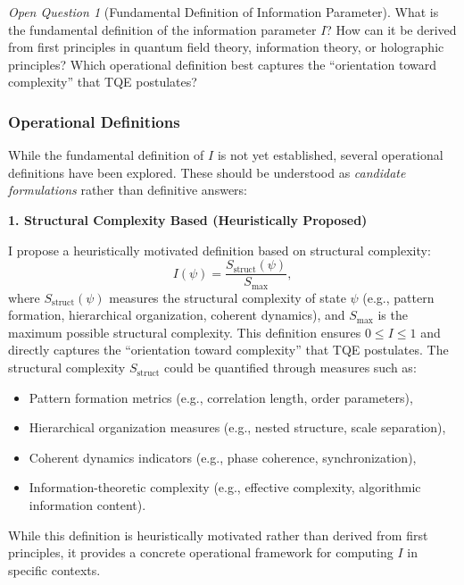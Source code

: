 \documentclass[12pt,a4paper]{article}
\theoremstyle{definition}
\theoremstyle{remark}
\newtheorem{question}{Open Question}[section]
\begin{document}
\begin{question}[Fundamental Definition of Information Parameter]
What is the fundamental definition of the information parameter $I$? How can it be derived from first principles in quantum field theory, information theory, or holographic principles? Which operational definition best captures the ``orientation toward complexity'' that TQE postulates?
\end{question}

\subsubsection{Operational Definitions}

While the fundamental definition of $I$ is not yet established, several operational definitions have been explored. These should be understood as \emph{candidate formulations} rather than definitive answers:

\textbf{1. Structural Complexity Based (Heuristically Proposed)}

I propose a heuristically motivated definition based on structural complexity:
\begin{equation}\label{eq:I_struct}
I(\psi) = \frac{S_{\text{struct}}(\psi)}{S_{\text{max}}},
\end{equation}
where $S_{\text{struct}}(\psi)$ measures the structural complexity of state $\psi$ (e.g., pattern formation, hierarchical organization, coherent dynamics), and $S_{\text{max}}$ is the maximum possible structural complexity. This definition ensures $0 \leq I \leq 1$ and directly captures the ``orientation toward complexity'' that TQE postulates. The structural complexity $S_{\text{struct}}$ could be quantified through measures such as:
\begin{itemize}
\item Pattern formation metrics (e.g., correlation length, order parameters),
\item Hierarchical organization measures (e.g., nested structure, scale separation),
\item Coherent dynamics indicators (e.g., phase coherence, synchronization),
\item Information-theoretic complexity (e.g., effective complexity, algorithmic information content).
\end{itemize}
While this definition is heuristically motivated rather than derived from first principles, it provides a concrete operational framework for computing $I$ in specific contexts.
\end{document}
